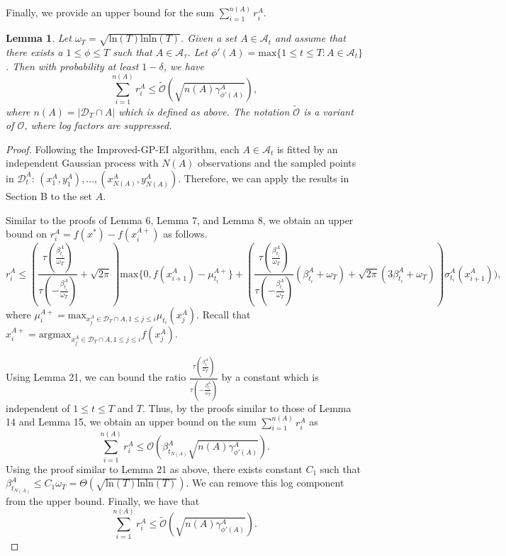 \documentclass[twoside]{article}
\newtheorem{lemma}{Lemma}
\begin{document}
Finally, we provide an upper bound for the sum $\sum_{i=1}^{n(A)}r^A_i$.
\begin{lemma}
Let $\omega_T = \sqrt{\text{ln}(T)\text{ln} \text{ln}(T)}$. Given a set $A \in \mathcal A_t$ and assume that there exists a $1 \le \phi \le T$ such that $A \in \mathcal A_{\tau}$. Let $\phi'(A) = \text{max}\{1 \le t \le T: A \in \mathcal A_t\}$. Then with probability at least $1 - \delta$, we have
$$\sum_{i=1}^{n(A)}r^A_i \le \tilde{\mathcal O}(\sqrt{n(A)\gamma^A_{\phi'(A)}}),$$
where $n(A) = |\mathcal D_T \cap A|$ which is defined as above. The notation $\tilde{\mathcal O}$ is a
variant of $\mathcal O$, where log factors are suppressed.
\label{lem3.5}
\end{lemma}
\begin{proof}
Following the Improved-GP-EI algorithm, each $A \in \mathcal A_t$ is fitted by an independent Gaussian process with $N(A)$ observations and the sampled points in $\mathcal D_t^A$: $(x_1^A,y_1^A), ..., (x_{N(A)}^A,y_{N(A)}^A)$. Therefore, we can apply the results in Section B to the set $A$.

Similar to the proofs of Lemma 6, Lemma 7, and Lemma 8, we obtain an upper bound on $r^A_i = f(x^*) - f(x^{A+}_i)$ as follows.
$$r^A_i \le (\frac{\tau(\frac{\beta^{A}_{t_i}}{\omega_T})}{ \tau(-\frac{\beta^{A}_{t_i}}{\omega_T})} + \sqrt{2\pi}) \text{max}\{0, f(x^A_{i+1}) - \mu^{A+}_{t_i}\} + (\frac{\tau(\frac{\beta^{A}_{t_i}}{\omega_T})}{ \tau(-\frac{\beta^{A}_{t_i}}{\omega_T})}(\beta^{A}_{t_i} + \omega_T) + \sqrt{2\pi}(3\beta^{A}_{t_i} + \omega_T))\sigma^A_{t_i}(x^A_{i+1})),$$
where $\mu^{A+}_i = \text{max}_{x^A_j \in \mathcal D_T \cap A, 1\le j \le i} \mu_{t_i}(x^A_j)$. Recall that $x^{A+}_i = \text{argmax}_{x^A_j \in \mathcal D_T \cap A, 1\le j \le i} f(x^A_j)$.

Using Lemma 21, we can bound the ratio $\frac{\tau(\frac{\beta^A_{t_i}}{\omega_T})}{ \tau(-\frac{\beta^A_{t_i}}{\omega_T})}$ by a constant which is independent of $1 \le t\le T$ and $T$. Thus, by the proofs similar to those of Lemma 14 and Lemma 15, we obtain an upper bound on the sum $\sum_{i=1}^{n(A)}r^A_i$ as
$$\sum_{i=1}^{n(A)}r^A_i \le \mathcal O(\beta^A_{t_{N(A)}}\sqrt{n(A)\gamma^A_{\phi'(A)}}).$$
Using the proof similar to Lemma 21 as above, there exists constant $C_1$ such that $\beta^A_{t_{N(A)}} \le C_1\omega_T = \Theta(\sqrt{\text{ln}(T)\text{ln} \text{ln}(T)})$. We can remove this log component from the upper bound. Finally, we have that
$$\sum_{i=1}^{n(A)}r^A_i \le \tilde{\mathcal O}(\sqrt{n(A)\gamma^A_{\phi'(A)}}).$$
\end{proof}
\end{document}
